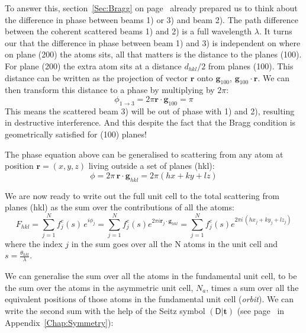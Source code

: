 \vspace{0.3cm}

To answer this, section~\ref{Sec:Bragg} on page~\pageref{Sec:Bragg} already prepared us to think about the difference in phase between beams 1) or 3) and beam 2). The path difference between the coherent scattered beams 1) and 2) is a full wavelength $\lambda$. It turns our that the difference in phase between beam 1) and 3) is independent on where on plane \hkl(200) the atoms sits, all that matters is the distance to the planes \hkl(100). For plane \hkl(200) the extra atom sits at a distance $d_{hkl}/2$ from planes \hkl(100). This distance can be written as the projection of vector $\mathbf{r}$ onto $\mathbf{g}_{100}$, \ie $\mathbf{g}_{100} \cdot \mathbf{r}$. We can then transform this distance to a phase by multiplying by $2\pi$:
\begin{equation*}
\phi_{1 \rightarrow 3} = 2\pi \mathbf{r} \cdot \mathbf{g}_{100} = \pi
\end{equation*}
This means the scattered beam 3) will be out of phase with 1) and 2), resulting in destructive interference. And this despite the fact that the Bragg condition is geometrically satisfied for \hkl(100) planes! 

The phase equation above can be generalised to scattering from any atom at position $\mathbf{r}=(x, y, z)$ living outside a set of planes \hkl(hkl):
\begin{equation*}
\phi = 2 \pi \, \mathbf{r} \cdot \mathbf{g}_{hkl} = 2\pi ( hx + ky + lz)
\end{equation*}

We are now ready to write out the full unit cell to the total scattering from planes \hkl(hkl) as the sum over the contributions of all the atoms:
\begin{equation}
\label{eq:scatFactEqS}
F_{hkl} = \sum_{j=1}^{N} f^e_j(s) \, e^{i\phi_j} =  \sum_{j=1}^{N} f^e_j(s) e^{2\pi i \mathbf{r}_j \cdot \mathbf{g}_{hkl}} =  \sum_{j=1}^{N} f^e_j(s) e^{2 \pi i \, (hx_j + ky_j + lz_j)}
\end{equation}
where the index $j$ in the sum goes over all the N atoms in the unit cell and $s=\frac{\theta_{hkl}}{\lambda}$.

We can generalise the sum over all the atoms in the fundamental unit cell, to be the sum over the atoms in the asymmetric unit cell, $N_a$, times a sum over all the equivalent positions of those atoms in the fundamental unit cell (\ie \textit{orbit})\cite{MarcTEM03}. We can write the second sum with the help of the Seitz symbol $(\mathsf{D}|\mathbf{t})$ (see page~\pageref{eq:Seitz} in Appendix~\ref{Chap:Symmetry}):

